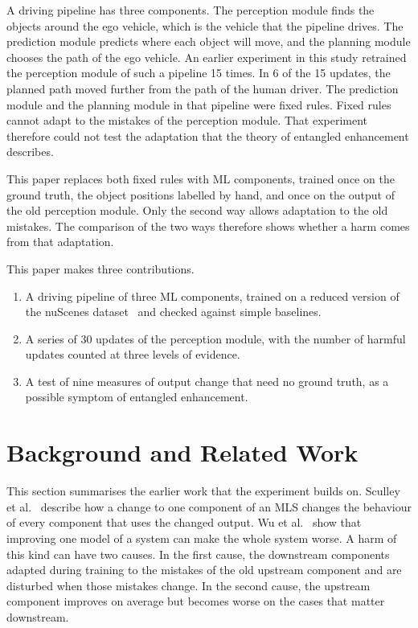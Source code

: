 \documentclass[conference]{IEEEtran}
\begin{document}
A driving pipeline has three components. The perception module finds the
objects around the ego vehicle, which is the vehicle that the pipeline drives.
The prediction module predicts where each object will move, and the planning
module chooses the path of the ego vehicle. An earlier experiment in this study
retrained the perception module of such a pipeline 15 times. In 6 of the 15 updates, the planned path moved further from the path of the human driver. The prediction module and the planning
module in that pipeline were fixed rules. Fixed rules cannot adapt to the mistakes of the perception module. That experiment therefore could not test the adaptation that the theory of entangled enhancement describes.

This paper replaces both fixed rules with ML components, trained once on the ground truth, the object positions labelled by hand, and once on the output of the old perception module. Only the second way allows adaptation to the old mistakes. The comparison of the two ways therefore shows whether a harm comes from that adaptation.

This paper makes three contributions.
\begin{enumerate}
\item A driving pipeline of three ML components, trained on a reduced version of
the nuScenes dataset~\cite{caesar2020nuscenes} and checked against simple
baselines.
\item A series of 30 updates of the perception module, with the number of
harmful updates counted at three levels of evidence.
\item A test of nine measures of output change that need no ground truth, as a
possible symptom of entangled enhancement.
\end{enumerate}

\section{Background and Related Work}

This section summarises the earlier work that the experiment builds on.
Sculley et al.~\cite{sculley2015hidden} describe how a change to one component
of an MLS changes the behaviour of every component that uses the changed
output. Wu et al.~\cite{wu2021fixesthatfail} show that improving one model of a
system can make the whole system worse. A harm of this kind can have two
causes. In the first cause, the downstream components adapted during training
to the mistakes of the old upstream component and are disturbed when those
mistakes change. In the second cause, the upstream component improves on
average but becomes worse on the cases that matter downstream.
\end{document}
